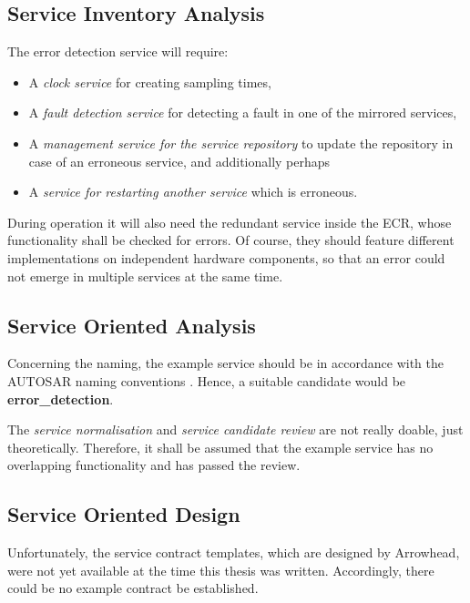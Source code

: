 \subsection{Service Inventory Analysis}


The error detection service will require:
\begin{itemize}
\item A \emph{clock service} for creating sampling times,
\item A \emph{fault detection service} for detecting a fault in one of the mirrored services,
\item A \emph{management service for the service repository} to update the repository in case of an erroneous service, and additionally perhaps
\item A \emph{service for restarting another service} which is erroneous.
\end{itemize}

During operation it will also need the redundant service inside the ECR, whose functionality shall be checked for errors. Of course, they should feature different implementations on independent hardware components, so that an error could not emerge in multiple services at the same time.


\subsection{Service Oriented Analysis}


Concerning the naming, the example service should be in accordance with the \mbox{AUTOSAR} naming conventions \cite{autosar_system_modelling}. Hence, a suitable candidate would be \textbf{error\_detection}.

The \emph{service normalisation} and \emph{service candidate review} are not really doable, just theoretically. Therefore, it shall be assumed that the example service has no overlapping functionality and has passed the review.





\subsection{Service Oriented Design}

Unfortunately, the service contract templates, which are designed by Arrowhead, were not yet available at the time this thesis was written. Accordingly, there could be no example contract be established.


